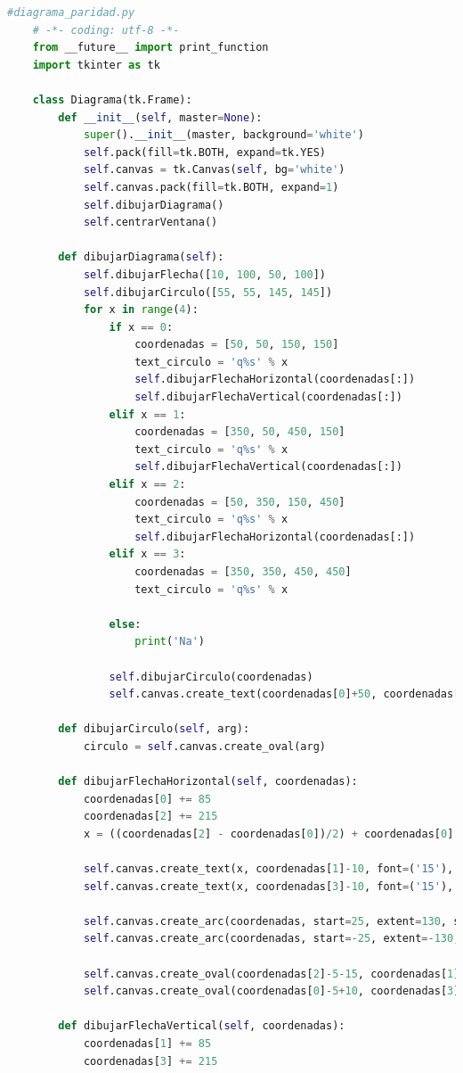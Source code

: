 	\begin{lstlisting}[language=Python]
	#diagrama_paridad.py
	# -*- coding: utf-8 -*-
	from __future__ import print_function
	import tkinter as tk
	
	class Diagrama(tk.Frame):
		def __init__(self, master=None):
			super().__init__(master, background='white')
			self.pack(fill=tk.BOTH, expand=tk.YES)
			self.canvas = tk.Canvas(self, bg='white')
			self.canvas.pack(fill=tk.BOTH, expand=1)
			self.dibujarDiagrama()
			self.centrarVentana()
		
		def dibujarDiagrama(self):
			self.dibujarFlecha([10, 100, 50, 100])
			self.dibujarCirculo([55, 55, 145, 145])
			for x in range(4):
				if x == 0:
					coordenadas = [50, 50, 150, 150]
					text_circulo = 'q%s' % x
					self.dibujarFlechaHorizontal(coordenadas[:])
					self.dibujarFlechaVertical(coordenadas[:])
				elif x == 1:
					coordenadas = [350, 50, 450, 150]
					text_circulo = 'q%s' % x
					self.dibujarFlechaVertical(coordenadas[:])
				elif x == 2:
					coordenadas = [50, 350, 150, 450]
					text_circulo = 'q%s' % x
					self.dibujarFlechaHorizontal(coordenadas[:])
				elif x == 3:
					coordenadas = [350, 350, 450, 450]
					text_circulo = 'q%s' % x
				
				else:
					print('Na')
				
				self.dibujarCirculo(coordenadas)
				self.canvas.create_text(coordenadas[0]+50, coordenadas[1]+50, font=('15'), text=text_circulo)
			
		def dibujarCirculo(self, arg):
			circulo = self.canvas.create_oval(arg)
		
		def dibujarFlechaHorizontal(self, coordenadas):
			coordenadas[0] += 85
			coordenadas[2] += 215
			x = ((coordenadas[2] - coordenadas[0])/2) + coordenadas[0]
			
			self.canvas.create_text(x, coordenadas[1]-10, font=('15'), text='1')
			self.canvas.create_text(x, coordenadas[3]-10, font=('15'), text='1')
			
			self.canvas.create_arc(coordenadas, start=25, extent=130, style='arc')
			self.canvas.create_arc(coordenadas, start=-25, extent=-130, style='arc')
			
			self.canvas.create_oval(coordenadas[2]-5-15, coordenadas[1]-5+25, coordenadas[2]+5-15, coordenadas[1]+5+25, fill = 'black')
			self.canvas.create_oval(coordenadas[0]-5+10, coordenadas[3]-5-30, coordenadas[0]+5+10, coordenadas[3]+5-30, fill = 'black')
		
		def dibujarFlechaVertical(self, coordenadas):
			coordenadas[1] += 85
			coordenadas[3] += 215
			

\end{lstlisting}
